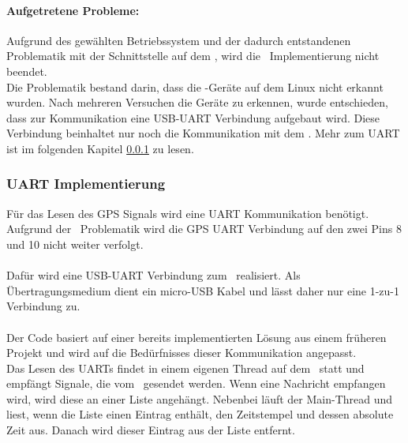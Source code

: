 \paragraph{Aufgetretene Probleme:}
Aufgrund des gewählten Betriebssystem und der dadurch entstandenen Problematik mit der Schnittstelle auf dem \rpi, wird die \iic\ Implementierung nicht beendet.\\
Die Problematik bestand darin, dass die \iic-Geräte auf dem Linux nicht erkannt wurden. Nach mehreren Versuchen die Geräte zu erkennen, wurde entschieden, dass zur Kommunikation eine USB-UART Verbindung aufgebaut wird. Diese Verbindung beinhaltet nur noch die Kommunikation mit dem \hwb. Mehr zum UART ist im folgenden Kapitel \ref{sec:uart} zu lesen.

\clearpage
\subsubsection{UART Implementierung}\label{sec:uart}
Für das Lesen des GPS Signals wird eine UART Kommunikation benötigt.
Aufgrund der \iic\ Problematik wird die GPS UART Verbindung auf den zwei Pins 8 und 10 nicht weiter verfolgt.\\
\\
Dafür wird eine USB-UART Verbindung zum \hwb\ realisiert. Als Übertragungsmedium dient ein micro-USB Kabel und lässt daher nur eine 1-zu-1 Verbindung zu.\\
\\
Der Code basiert auf einer bereits implementierten Lösung aus einem früheren Projekt und wird auf die Bedürfnisses dieser Kommunikation angepasst.\\
Das Lesen des UARTs findet in einem eigenen Thread auf dem \rpi\ statt und empfängt Signale, die vom \hwb\ gesendet werden. Wenn eine Nachricht empfangen wird, wird diese an einer Liste angehängt. Nebenbei läuft der Main-Thread und liest, wenn die Liste einen Eintrag enthält, den Zeitstempel und dessen absolute Zeit aus. Danach wird dieser Eintrag aus der Liste entfernt.